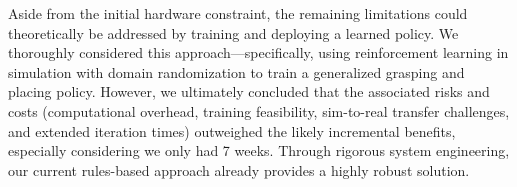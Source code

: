 \noindent Aside from the initial hardware constraint, the remaining limitations could theoretically be addressed by training and deploying a learned policy. We thoroughly considered this approach---specifically, using reinforcement learning in simulation with domain randomization to train a generalized grasping and placing policy. However, we ultimately concluded that the associated risks and costs (computational overhead, training feasibility, sim-to-real transfer challenges, and extended iteration times) outweighed the likely incremental benefits, especially considering we only had 7 weeks. Through rigorous system engineering, our current rules-based approach already provides a highly robust solution.
